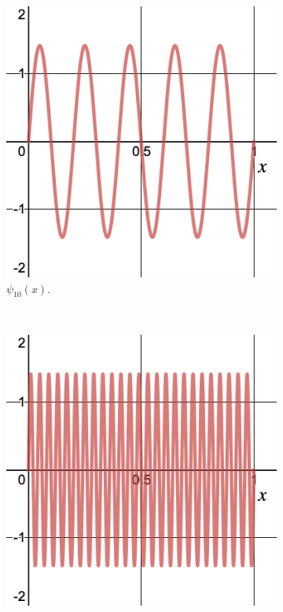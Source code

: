 \begin{figure}[H]
        \begin{subfigure}[h]{0.3\textwidth}
        \includegraphics[width=\textwidth]{Figures_Part_2/state_10.png}
        \caption{$\psi_{10}(x)$.}
    \end{subfigure}
    ~ 
    \begin{subfigure}[h]{0.3\textwidth}
        \includegraphics[width=\textwidth]{Figures_Part_2/state_50.png}

\end{subfigure}
\end{figure}
